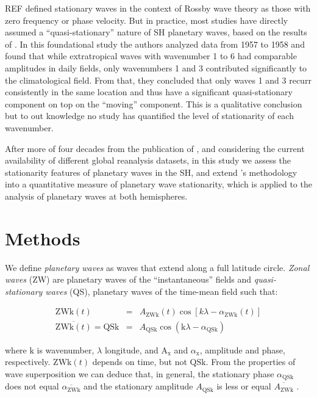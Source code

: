 \documentclass[draft,linenumbers]{agujournal2018}
\begin{document}
REF defined stationary waves in the context of Rossby wave theory as
those with zero frequency or phase velocity. But in practice, most
studies have directly assumed a ``quasi-stationary'' nature of SH
planetary waves, based on the results of \citet{Loon1972}. In this
foundational study the authors analyzed data from 1957 to 1958 and found
that while extratropical waves with wavenumber 1 to 6 had comparable
amplitudes in daily fields, only wavenumbers 1 and 3 contributed
significantly to the climatological field. From that, they concluded
that only waves 1 and 3 recurr consistently in the same location and
thus have a significant quasi-stationary component on top on the
``moving'' component. This is a qualitative conclusion but to out
knowledge no study has quantified the level of stationarity of each
wavenumber.

After more of four decades from the publication of \citet{Loon1972}, and
considering the current availability of different global reanalysis
datasets, in this study we assess the stationarity features of planetary
waves in the SH, and extend \citet{Loon1972}'s methodology into a
quantitative measure of planetary wave stationarity, which is applied to
the analysis of planetary waves at both hemispheres.

\section{Methods}

We define \emph{planetary waves} as waves that extend along a full
latitude circle. \emph{Zonal waves} (ZW) are planetary waves of the
``instantaneous'' fields and \emph{quasi-stationary waves} (QS),
planetary waves of the time-mean field such that:

\begin{linenomath*}
\begin{eqnarray}\label{eq:ZW}
\mathrm{ZWk}(t) & = & A_\mathrm{ZWk}(t)\cos \left [ k\lambda - \alpha_\mathrm{ZWk}(t) \right ] \\ 
\overline{\mathrm{ZWk}(t)} = \mathrm{QSk} & = & A_\mathrm{QSk}\cos \left (  \mathrm{k}\lambda - \alpha_\mathrm{QSk} \right ) \label{eq:QS}
\end{eqnarray}
\end{linenomath*}

where \(\mathrm{k}\) is wavenumber, \(\lambda\) longitude, and
\(\mathrm{A_{x}}\) and \(\alpha_\mathrm{x}\), amplitude and phase,
respectively. \(\mathrm{ZWk}(t)\) depends on time, but not
\(\mathrm{QSk}\). From the properties of wave superposition we can
deduce that, in general, the stationary phase \(\alpha_\mathrm{QSk}\)
does not equal \(\overline{\alpha_\mathrm{ZWk}}\) and the stationary
amplitude \(A_\mathrm{QSk}\) is less or equal
\(\overline{A_\mathrm{ZWk}}\) \citep{Pain2005}.
\end{document}
